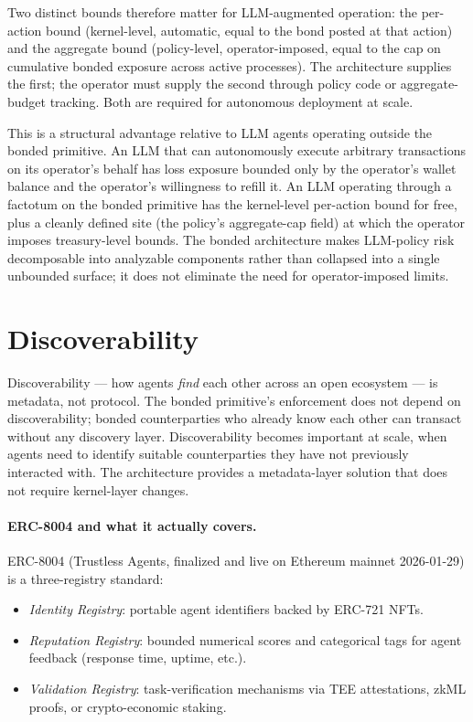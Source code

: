 \documentclass[11pt,a4paper]{article}
\theoremstyle{definition}
\theoremstyle{remark}
\begin{document}
Two distinct bounds therefore matter for LLM-augmented operation:
the per-action bound (kernel-level, automatic, equal to the bond
posted at that action) and the aggregate bound (policy-level,
operator-imposed, equal to the cap on cumulative bonded exposure
across active processes). The architecture supplies the first;
the operator must supply the second through policy code or
aggregate-budget tracking. Both are required for autonomous
deployment at scale.

This is a structural advantage relative to LLM agents operating
outside the bonded primitive. An LLM that can autonomously execute
arbitrary transactions on its operator's behalf has loss exposure
bounded only by the operator's wallet balance and the operator's
willingness to refill it. An LLM operating through a factotum on
the bonded primitive has the kernel-level per-action bound for
free, plus a cleanly defined site (the policy's aggregate-cap
field) at which the operator imposes treasury-level bounds. The
bonded architecture makes LLM-policy risk decomposable into
analyzable components rather than collapsed into a single
unbounded surface; it does not eliminate the need for
operator-imposed limits.

\section{Discoverability}
\label{sec:discoverability}

Discoverability --- how agents \emph{find} each other across an open
ecosystem --- is metadata, not protocol. The bonded primitive's
enforcement does not depend on discoverability; bonded counterparties
who already know each other can transact without any discovery layer.
Discoverability becomes important at scale, when agents need to
identify suitable counterparties they have not previously
interacted with. The architecture provides a metadata-layer
solution that does not require kernel-layer changes.

\paragraph{ERC-8004 and what it actually covers.}
ERC-8004 \citep{erc8004} (Trustless Agents, finalized and live on
Ethereum mainnet 2026-01-29) is a three-registry standard:

\begin{itemize}
  \item \emph{Identity Registry}: portable agent identifiers backed
    by ERC-721 NFTs.
  \item \emph{Reputation Registry}: bounded numerical scores and
    categorical tags for agent feedback (response time, uptime,
    etc.).
  \item \emph{Validation Registry}: task-verification mechanisms
    via TEE attestations, zkML proofs, or crypto-economic
    staking.
\end{itemize}
\end{document}
